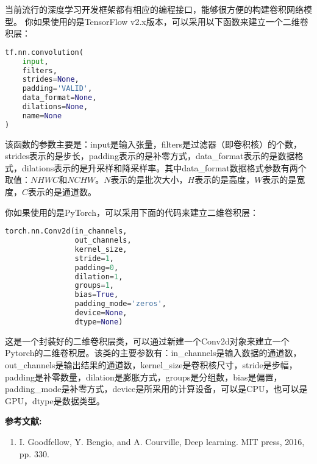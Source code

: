 当前流行的深度学习开发框架都有相应的编程接口，能够很方便的构建卷积网络模型。
你如果使用的是TensorFlow v2.x版本，可以采用以下函数来建立一个二维卷积层：
\begin{lstlisting}[language=python]
tf.nn.convolution(
    input,
    filters,
    strides=None,
    padding='VALID',
    data_format=None,
    dilations=None,
    name=None
)
\end{lstlisting}
该函数的参数主要是：input是输入张量，filters是过滤器（即卷积核）的个数，strides表示的是步长，padding表示的是补零方式，data_format表示的是数据格式，dilations表示的是升采样和降采样率。其中data_format数据格式参数有两个取值：$NHWC$和$NCHW$。$N$表示的是批次大小，$H$表示的是高度，$W$表示的是宽度，$C$表示的是通道数。

你如果使用的是PyTorch，可以采用下面的代码来建立二维卷积层：
\begin{lstlisting}[language=python]
torch.nn.Conv2d(in_channels, 
                out_channels, 
                kernel_size,
                stride=1, 
                padding=0,
                dilation=1,
                groups=1,
                bias=True,
                padding_mode='zeros',
                device=None,
                dtype=None)
\end{lstlisting}
这是一个封装好的二维卷积层类，可以通过新建一个Conv2d对象来建立一个Pytorch的二维卷积层。该类的主要参数有：in_channels是输入数据的通道数，out_channels是输出结果的通道数，kernel_size是卷积核尺寸，stride是步幅，padding是补零数量，dilation是膨胀方式，groups是分组数，bias是偏置，padding_mode是补零方式，device是所采用的计算设备，可以是CPU，也可以是GPU，dtype是数据类型。


\textbf{参考文献:}
\begin{enumerate}
\item I. Goodfellow, Y. Bengio, and A. Courville, Deep learning. MIT press, 2016, pp. 330.
\end{enumerate}